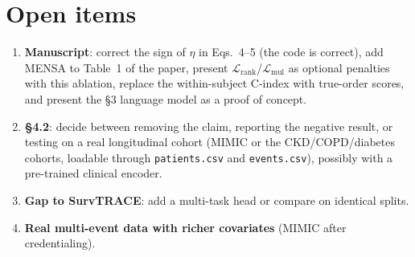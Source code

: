 \documentclass[11pt,a4paper]{article}
\newcommand{\Lrank}{$\mathcal{L}_{\mathrm{rank}}$}
\newcommand{\Lmul}{$\mathcal{L}_{\mathrm{mul}}$}
\begin{document}
\section{Open items}\label{sec:open}
\begin{enumerate}
  \item \textbf{Manuscript}: correct the sign of $\eta$ in Eqs.~4--5 (the code is correct), add MENSA to Table~1 of
        the paper, present \Lrank{}/\Lmul{} as optional penalties with this ablation, replace the within-subject
        C-index with true-order scores, and present the \S3 language model as a proof of concept.
  \item \textbf{\S4.2}: decide between removing the claim, reporting the negative result, or testing on a real
        longitudinal cohort (MIMIC or the CKD/COPD/diabetes cohorts, loadable through \texttt{patients.csv} and
        \texttt{events.csv}), possibly with a pre-trained clinical encoder.
  \item \textbf{Gap to SurvTRACE}: add a multi-task head or compare on identical splits.
  \item \textbf{Real multi-event data with richer covariates} (MIMIC after credentialing).
\end{enumerate}

\appendix
\end{document}
